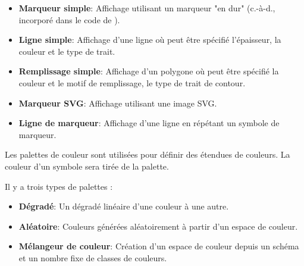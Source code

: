 
\begin{itemize}[label=--]
\item \textbf{Marqueur simple}: Affichage utilisant un marqueur "en dur" (c.-à-d., incorporé dans le code de \qg).
\item \textbf{Ligne simple}: Affichage d'une ligne où peut être spécifié l'épaisseur, la couleur et le type de trait.
\item \textbf{Remplissage simple}: Affichage d'un polygone où peut être spécifié la couleur et le motif de remplissage, le type de trait de contour.
\item \textbf{Marqueur SVG}: Affichage utilisant une image SVG.
\item \textbf{Ligne de marqueur}: Affichage d'une ligne en répétant un symbole de marqueur.
\end{itemize}


Les palettes de couleur sont utilisées pour définir des étendues de couleurs. La couleur d'un symbole sera tirée de la palette.

Il y a trois types de palettes :

\begin{itemize}[label=--]
\item \textbf{Dégradé}: Un dégradé linéaire d'une couleur à une autre.
\item \textbf{Aléatoire}: Couleurs générées aléatoirement à partir d'un espace de couleur.
\item \textbf{Mélangeur de couleur}: Création d'un espace de couleur depuis un schéma et un nombre fixe de classes de couleurs.
\end{itemize}

